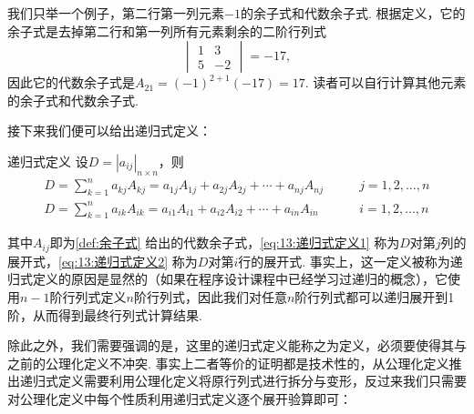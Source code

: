 \begin{solution}
    我们只举一个例子，第二行第一列元素$-1$的余子式和代数余子式. 根据定义，它的余子式是去掉第二行和第一列所有元素剩余的二阶行列式
    \[\begin{vmatrix}
            1 & 3  \\
            5 & -2
        \end{vmatrix}=-17,\]
    因此它的代数余子式是$A_{21}=(-1)^{2+1}(-17)=17$. 读者可以自行计算其他元素的余子式和代数余子式.
\end{solution}

接下来我们便可以给出递归式定义：
\begin{definition}{}{递归式定义}
    设$D=|a_{ij}|_{n \times n}$，则
    \begin{align}
        \label{eq:13:递归式定义1}
        D=\sum_{k=1}^{n}a_{kj}A_{kj}=a_{1j}A_{1j}+a_{2j}A_{2j}+\cdots+a_{nj}A_{nj} & \qquad j=1,2,\ldots,n \\
        \label{eq:13:递归式定义2}
        D=\sum_{k=1}^{n}a_{ik}A_{ik}=a_{i1}A_{i1}+a_{i2}A_{i2}+\cdots+a_{in}A_{in} & \qquad i=1,2,\ldots,n
    \end{align}
\end{definition}
其中$A_{ij}$即为\autoref{def:余子式} 给出的代数余子式，\autoref{eq:13:递归式定义1} 称为$D$对第$j$列的展开式，\autoref{eq:13:递归式定义2} 称为$D$对第$i$行的展开式. 事实上，这一定义被称为递归式定义的原因是显然的（如果在程序设计课程中已经学习过递归的概念），它使用$n-1$阶行列式定义$n$阶行列式，因此我们对任意$n$阶行列式都可以递归展开到1阶，从而得到最终行列式计算结果.

除此之外，我们需要强调的是，这里的递归式定义能称之为定义，必须要使得其与之前的公理化定义不冲突. 事实上二者等价的证明都是技术性的，从公理化定义推出递归式定义需要利用公理化定义将原行列式进行拆分与变形，反过来我们只需要对公理化定义中每个性质利用递归式定义逐个展开验算即可：

